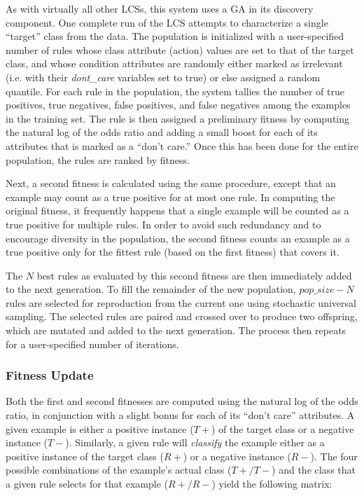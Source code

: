 \documentclass[11pt]{article}
\begin{document}
As with virtually all other LCSs, this system uses a GA in its discovery component. One complete run of the LCS attempts to characterize a single ``target'' class from the data. The population is initialized with a user-specified number of rules whose class attribute (action) values are set to that of the target class, and whose condition attributes are randomly either marked as irrelevant (i.e. with their \textit{dont\_care} variables set to true) or else assigned a random quantile. For each rule in the population, the system tallies the number of true positives, true negatives, false positives, and false negatives among the examples in the training set. The rule is then assigned a preliminary fitness by computing the natural log of the odds ratio and adding a small boost for each of its attributes that is marked as a ``don't care.'' Once this has been done for the entire population, the rules are ranked by fitness. 

Next, a second fitness is calculated using the same procedure, except that an example may count as a true positive for at most one rule. In computing the original fitness, it frequently happens that a single example will be counted as a true positive for multiple rules. In order to avoid such redundancy and to encourage diversity in the population, the second fitness counts an example as a true positive only for the fittest rule (based on the first fitness) that covers it. 

The $N$ best rules as evaluated by this second fitness are then immediately added to the next generation. To fill the remainder of the new population, $pop\_size - N$ rules are selected for reproduction from the current one using stochastic universal sampling. The selected rules are paired and crossed over to produce two offspring, which are mutated and added to the next generation. The process then repeats for a user-specified number of iterations.

\subsubsection{Fitness Update}

Both the first and second fitnesses are computed using the natural log of the odds ratio, in conjunction with a slight bonus for each of its ``don't care'' attributes. A given example is either a positive instance ($T+$) of the target class or a negative instance ($T-$). Similarly, a given rule will \emph{classify} the example either as a positive instance of the target class ($R+$) or a negative instance ($R-$). The four possible combinations of the example's actual class \mbox{($T+/T-$)} and the class that a given rule selects for that example ($R+/R-$) yield the following matrix:
\end{document}
